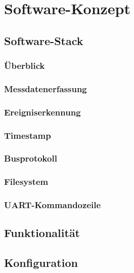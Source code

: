 %
%

\chapter{Software-Konzept}\label{chap.software}


\section{Software-Stack}\label{sec.sw_stack}


\subsection{Überblick}\label{subsec.sw_ueberblick}


\subsection{Messdatenerfassung}\label{subsec.sw_messen}


\subsection{Ereigniserkennung}\label{subsec.sw_ereignis}


\subsection{Timestamp}\label{subsec.sw_timestamp}


\subsection{Busprotokoll}\label{subsec.sw_busprotokoll}


\subsection{Filesystem}\label{subsec.sw_filesystem}


\subsection{UART-Kommandozeile}\label{subsec.sw_uart}


\section{Funktionalität}\label{sec.sw_funktionalitaet}


\section{Konfiguration}\label{sec.sw_konfiguration}

